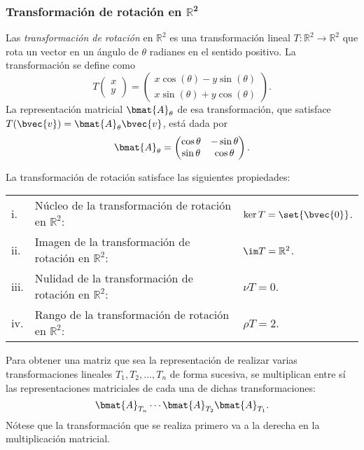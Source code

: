 \documentclass{fmbnotes}
\begin{document}
\subsubsection[Transformación de rotación en \(\mathbb{R}^{2}\)]{Transformación de rotación en \(\bm{\mathbb{R}^{2}}\)}
Las \emph{transformación de rotación} en \(\mathbb{R}^{2}\) es una transformación lineal \(T\colon\mathbb{R}^{2}\to\mathbb{R}^{2}\) que rota un vector en un ángulo de \(\theta\) radianes en el sentido positivo. La transformación se define como
\begin{equation*}
	T\begin{pmatrix}
	x \\ y
	\end{pmatrix}=\begin{pmatrix}
	x\cos(\theta)-y\sin(\theta) \\ x\sin(\theta)+y\cos(\theta)
	\end{pmatrix}.
	\label{eq:transformacion_rotacion_R2}
\end{equation*}
La representación matricial \(\bmat{A}_\theta\) de esa transformación, que satisface \(T(\bvec{v})=\bmat{A}_\theta\bvec{v}\), está dada por
\[\bmat{A}_\theta=\begin{pmatrix}
\cos\theta & -\sin\theta \\ \sin\theta & \cos\theta
\end{pmatrix}.\]

La transformación de rotación satisface las siguientes propiedades:
\begin{longtable}{lll}
	\rule[1ex]{0pt}{2.5ex}i.&Núcleo de la transformación de rotación en \(\mathbb{R}^{2}\): &\(\ker T = \set{\bvec{0}}\). \\
	\rule[1ex]{0pt}{2.5ex}ii.&Imagen de la transformación de rotación en \(\mathbb{R}^{2}\): &\(\im T = \mathbb{R}^{2}\). \\
	\rule[1ex]{0pt}{2.5ex}iii.&Nulidad de la transformación de rotación en \(\mathbb{R}^{2}\): &\(\nu T = 0\). \\
	\rule[1ex]{0pt}{2.5ex}iv.&Rango de la transformación de rotación en \(\mathbb{R}^{2}\): &\(\rho T = 2\). \\
\end{longtable}

\begin{tip}
	Para obtener una matriz que sea la representación de realizar varias transformaciones lineales \(T_1,T_2,\ldots,T_n\) de forma sucesiva, se multiplican entre sí las representaciones matriciales de cada una de dichas transformaciones: \[\bmat{A}_{T_n}\cdots\bmat{A}_{T_2}\bmat{A}_{T_1}.\] 
	Nótese que la transformación que se realiza primero va a la derecha en la multiplicación matricial.
\end{tip}
\end{document}

